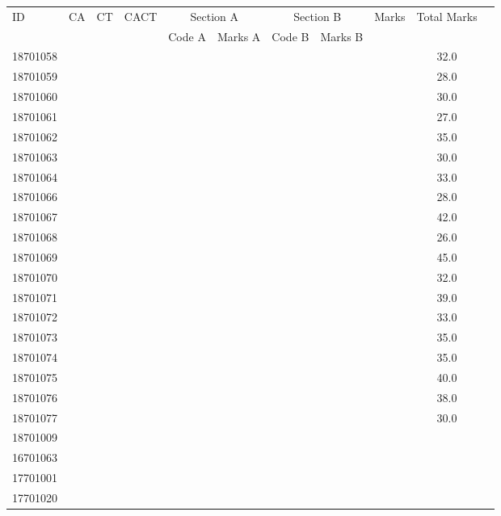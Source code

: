 \documentclass[12pt]{article}
\begin{document}
    \begin{center} 
	\renewcommand{\arraystretch}{1.08}
	\begin{small}
    \begin{tabular}{|l|c|c|c|c|c|c|c|c|c|c|} \hline
	\multirow{2}{*}{ID} & 	\multirow{2}{*}{CA}  & 	\multirow{2}{*}{CT}  & 	\multirow{2}{*}{CACT}  & \multicolumn{2 }{|c|}{Section A}& \multicolumn{2 }{c|}{Section B} & 	\multirow{2}{*}{Marks}  & 	\multirow{2}{*}{Total Marks}  \\ 
	&  &  &  & Code A & Marks A & Code B & Marks B&  &  \\ \hline
18701058 &  &  &  &  &  &  &  &  & 32.0\\ \hline 
18701059 &  &  &  &  &  &  &  &  & 28.0\\ \hline 
18701060 &  &  &  &  &  &  &  &  & 30.0\\ \hline 
18701061 &  &  &  &  &  &  &  &  & 27.0\\ \hline 
18701062 &  &  &  &  &  &  &  &  & 35.0\\ \hline 
18701063 &  &  &  &  &  &  &  &  & 30.0\\ \hline 
18701064 &  &  &  &  &  &  &  &  & 33.0\\ \hline 
18701066 &  &  &  &  &  &  &  &  & 28.0\\ \hline 
18701067 &  &  &  &  &  &  &  &  & 42.0\\ \hline 
18701068 &  &  &  &  &  &  &  &  & 26.0\\ \hline 
18701069 &  &  &  &  &  &  &  &  & 45.0\\ \hline 
18701070 &  &  &  &  &  &  &  &  & 32.0\\ \hline 
18701071 &  &  &  &  &  &  &  &  & 39.0\\ \hline 
18701072 &  &  &  &  &  &  &  &  & 33.0\\ \hline 
18701073 &  &  &  &  &  &  &  &  & 35.0\\ \hline 
18701074 &  &  &  &  &  &  &  &  & 35.0\\ \hline 
18701075 &  &  &  &  &  &  &  &  & 40.0\\ \hline 
18701076 &  &  &  &  &  &  &  &  & 38.0\\ \hline 
18701077 &  &  &  &  &  &  &  &  & 30.0\\ \hline 
18701009 &  &  &  &  &  &  &  &  & \\ \hline 
16701063 &  &  &  &  &  &  &  &  & \\ \hline 
17701001 &  &  &  &  &  &  &  &  & \\ \hline 
17701020 &  &  &  &  &  &  &  &  & \\ \hline 

\end{tabular}
\end{small}
\end{center}
\end{document}

